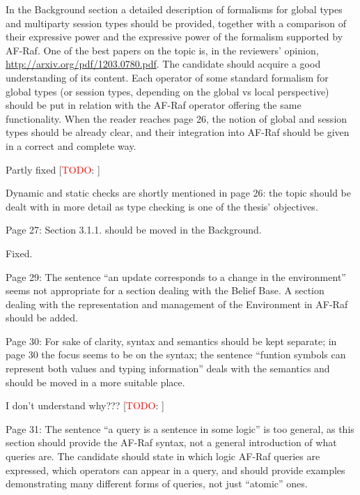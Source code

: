 \documentclass{article}
\newcommand{\todo}[1]{[\textcolor{red}{TODO}: #1]}
\newenvironment{them}{\noindent\begingroup\color{blue}}{\endgroup\par}
\begin{document}
\begin{them}

In the Background section a detailed description of formalisms for global types and multiparty session types should be provided, together with a comparison of their expressive power and the expressive power of the formalism supported by AF-Raf. One of the best papers on the topic is, in the reviewers' opinion, \url{http://arxiv.org/pdf/1203.0780.pdf}. The candidate should acquire a good understanding of its content. Each operator of some standard formalism for global types (or session types, depending on the global vs local perspective) should be put in relation with the AF-Raf operator offering the same functionality. When the reader reaches page 26, the notion of global and session types should be already clear, and their integration into AF-Raf should be given in a correct and complete way.
\end{them}
Partly fixed
\todo{} 

\begin{them}

Dynamic and static checks are shortly mentioned in page 26: the topic should be dealt with in more detail as type checking is one of the thesis' objectives.
\end{them}
\todo{expand this}

\begin{them}

Page 27:
Section 3.1.1. should be moved in the Background.
\end{them}
Fixed. 

\begin{them}

Page 29:
The sentence “an update corresponds to a change in the environment” seems not appropriate for a section dealing with the Belief Base. A section dealing with the representation and management of the Environment in AF-Raf should be added.
\end{them}
\todo{}

\begin{them}

Page 30:
For sake of clarity, syntax and semantics should be kept separate; in page 30 the focus seems to be on the syntax; the sentence “funtion symbols can represent both values and typing information” deals with the semantics and should be moved in a more suitable place.
\end{them}
I don't understand why???
\todo{}

\begin{them}

Page 31:
The sentence “a query is a sentence in some logic” is too general, as this section should provide the AF-Raf syntax, not a general introduction of what queries are. The candidate should state in which logic AF-Raf queries are expressed, which operators can appear in a query, and should provide examples demonstrating many different forms of queries, not just “atomic” ones.
\end{them}
\todo{}
\end{document}
